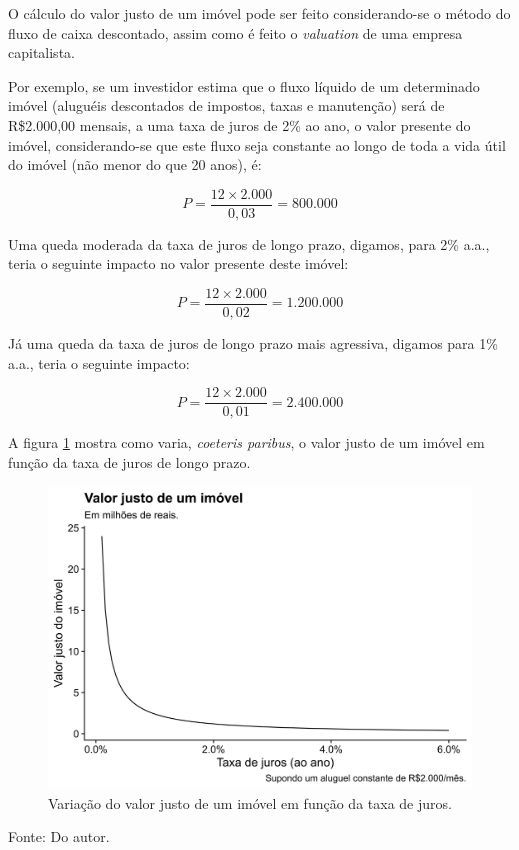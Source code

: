 \documentclass[
	12pt,				%
	oneside,			%
	a4paper,			%
	chapter=TITLE,		%
	section=TITLE,		%
	english,			%
	brazil				%
	]{abntex2}
\newcommand{\bcenter}{\begin{center}}
\newcommand{\ecenter}{\end{center}}
\begin{document}
O cálculo do valor justo de um imóvel pode ser feito considerando-se o método
do fluxo de caixa descontado, assim como é feito o \emph{valuation} de uma empresa
capitalista.

Por exemplo, se um investidor estima que o fluxo líquido de um determinado
imóvel (aluguéis descontados de impostos, taxas e manutenção) será de R\$2.000,00
mensais, a uma taxa de juros de 2\% ao ano, o valor presente do imóvel,
considerando-se que este fluxo seja constante ao longo de toda a vida útil do
imóvel (não menor do que 20 anos), é:

\[P = \frac{12 \times 2.000}{0,03} = 800.000\]

Uma queda moderada da taxa de juros de longo prazo, digamos, para 2\% a.a.,
teria o seguinte impacto no valor presente deste imóvel:

\[P = \frac{12 \times 2.000}{0,02} = 1.200.000\]

Já uma queda da taxa de juros de longo prazo mais agressiva, digamos para 1\%
a.a., teria o seguinte impacto:

\[P = \frac{12 \times 2.000}{0,01} = 2.400.000\]

A figura \ref{fig:valores-juros} mostra como varia, \emph{coeteris paribus}, o valor
justo de um imóvel em função da taxa de juros de longo prazo.
\begin{figure}[H]

{\centering \includegraphics[width=0.7\linewidth]{images/valores-juros-1} 

}

\caption{Variação do valor justo de um imóvel em função da taxa de juros.}\label{fig:valores-juros}
\end{figure}
\bcenter

Fonte: Do autor.
\ecenter
\end{document}
